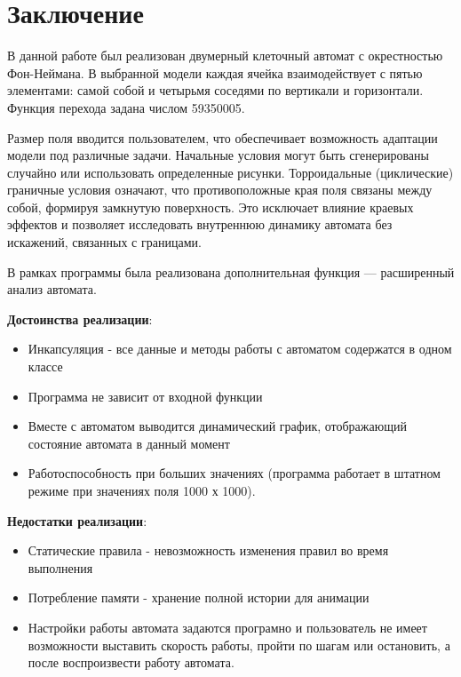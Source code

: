 \documentclass[11pt,a4paper,final]{article}
\begin{document}
		\newpage
		\section* {Заключение}
		В данной работе был реализован двумерный клеточный автомат с окрестностью Фон-Неймана. В
		выбранной модели каждая ячейка взаимодействует с пятью элементами: самой собой	и четырьмя соседями по вертикали и горизонтали. Функция перехода задана числом
		59350005. 
		\par Размер поля вводится пользователем, что обеспечивает возможность адаптации модели под различные задачи. Начальные условия могут быть сгенерированы случайно или использовать определенные рисунки. Торроидальные (циклические) граничные условия означают, что противоположные края поля связаны между собой, формируя замкнутую поверхность. Это
		исключает влияние краевых эффектов и позволяет исследовать внутреннюю динамику автомата без искажений, связанных с границами. 
		\par В рамках программы была реализована дополнительная функция — расширенный анализ автомата.
		
	     \par \textbf{Достоинства реализации}: 
		
		\begin{itemize}
			\item Инкапсуляция - все данные и методы работы с автоматом содержатся в одном классе
			\item Программа не зависит от входной функции
			\item Вместе с автоматом выводится динамический график, отображающий состояние автомата в данный момент
			\item Работоспособность при больших значениях (программа работает в штатном режиме при значениях поля 1000 х 1000).
		\end{itemize}
		
		\par \textbf{Недостатки реализации}: 
		
		\begin{itemize}
			\item Статические правила - невозможность изменения правил во время выполнения
			\item Потребление памяти - хранение полной истории для анимации
			\item Настройки работы автомата задаются програмно и пользователь не имеет возможности выставить скорость работы, пройти по шагам или остановить, а после воспроизвести работу автомата.
		\end{itemize}
		
\end{document}
